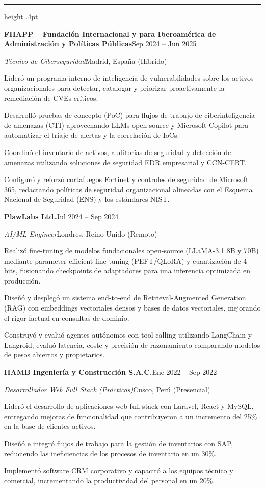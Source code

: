 \documentclass[a4paper,10pt]{article}
\newcommand{\sectiontitle}[1]{\par\vspace{8pt}{\fontsize{10.5}{12}\selectfont\bfseries\MakeUppercase{#1}}\par\vspace{2.5pt}\hrule height .4pt\vspace{4.5pt}}
\newcommand{\jobheader}[4]{\textbf{#1}\hfill {\fontsize{9.5}{12}\selectfont #2}\par {\fontsize{9.5}{12}\selectfont\textit{#3}}\hfill {\fontsize{9.5}{12}\selectfont #4}\par\vspace{2pt}}
\newenvironment{cvbullets}{\begin{list}{\textbullet}{\setlength{\leftmargin}{11pt}\setlength{\labelwidth}{6pt}\setlength{\labelsep}{5pt}\setlength{\topsep}{0pt}\setlength{\partopsep}{0pt}\setlength{\parsep}{0pt}\setlength{\itemsep}{1.5pt}}}{\end{list}\vspace{4pt}}
\begin{document}
\sectiontitle{Experiencia Profesional}

\jobheader{FIIAPP -- Fundación Internacional y para Iberoamérica de Administración y Políticas Públicas}{Sep 2024 -- Jun 2025}{Técnico de Ciberseguridad}{Madrid, España (Híbrido)}
\begin{cvbullets}
\item Lideró un programa interno de inteligencia de vulnerabilidades sobre los activos organizacionales para detectar, catalogar y priorizar proactivamente la remediación de CVEs críticos.
\item Desarrolló pruebas de concepto (PoC) para flujos de trabajo de ciberinteligencia de amenazas (CTI) aprovechando LLMs open-source y Microsoft Copilot para automatizar el triaje de alertas y la correlación de IoCs.
\item Coordinó el inventario de activos, auditorías de seguridad y detección de amenazas utilizando soluciones de seguridad EDR empresarial y CCN-CERT.
\item Configuró y reforzó cortafuegos Fortinet y controles de seguridad de Microsoft 365, redactando políticas de seguridad organizacional alineadas con el Esquema Nacional de Seguridad (ENS) y los estándares NIST.
\end{cvbullets}

\jobheader{PlawLabs Ltd.}{Jul 2024 -- Sep 2024}{AI/ML Engineer}{Londres, Reino Unido (Remoto)}
\begin{cvbullets}
\item Realizó fine-tuning de modelos fundacionales open-source (LLaMA-3.1 8B y 70B) mediante parameter-efficient fine-tuning (PEFT/QLoRA) y cuantización de 4 bits, fusionando checkpoints de adaptadores para una inferencia optimizada en producción.
\item Diseñó y desplegó un sistema end-to-end de Retrieval-Augmented Generation (RAG) con embeddings vectoriales densos y bases de datos vectoriales, mejorando el rigor factual en consultas de dominio.
\item Construyó y evaluó agentes autónomos con tool-calling utilizando LangChain y Langroid; evaluó latencia, coste y precisión de razonamiento comparando modelos de pesos abiertos y propietarios.
\end{cvbullets}

\jobheader{HAMB Ingeniería y Construcción S.A.C.}{Ene 2022 -- Sep 2022}{Desarrollador Web Full Stack (Prácticas)}{Cusco, Perú (Presencial)}
\begin{cvbullets}
\item Lideró el desarrollo de aplicaciones web full-stack con Laravel, React y MySQL, entregando mejoras de funcionalidad que contribuyeron a un incremento del 25\% en la base de clientes activos.
\item Diseñó e integró flujos de trabajo para la gestión de inventarios con SAP, reduciendo las ineficiencias de los procesos de inventario en un 30\%.
\item Implementó software CRM corporativo y capacitó a los equipos técnico y comercial, incrementando la productividad del personal en un 20\%.
\end{cvbullets}
\end{document}
